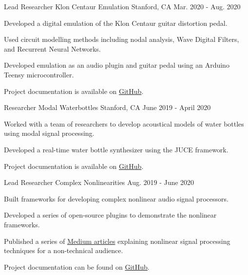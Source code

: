 \begin{cventries}
  \cventry
    {Lead Researcher} %
    {Klon Centaur Emulation} %
    {Stanford, CA} %
    {Mar. 2020 - Aug. 2020} %
    {
      \begin{cvitems} %
        \item {Developed a digital emulation of the Klon Centaur guitar distortion pedal.}
        \item {Used circuit modelling methods including nodal analysis, Wave Digital Filters, and Recurrent Neural Networks.}
        \item {Developed emulation as an audio plugin and guitar pedal using an Arduino Teensy microcontroller.}
        \item {Project documentation is available on \href{https://github.com/jatinchowdhury18/KlonCentaur}{GitHub}.}
      \end{cvitems}
    }

  \cventry
    {Researcher} %
    {Modal Waterbottles} %
    {Stanford, CA} %
    {June 2019 - April 2020} %
    {
      \begin{cvitems} %
        \item {Worked with a team of researchers to develop acoustical
               models of water bottles using modal signal processing.}
        \item {Developed a real-time water bottle synthesizer using the JUCE framework.}
        \item {Project documentation is available on \href{https://github.com/jatinchowdhury18/modal-waterbottles}{GitHub}.}
      \end{cvitems}
    }

  \cventry
    {Lead Researcher} %
    {Complex Nonlinearities} %
    {} %
    {Aug. 2019 - June 2020} %
    {
      \begin{cvitems} %
        \item {Built frameworks for developing complex nonlinear audio signal processors.}
        \item {Developed a series of open-source plugins to demonstrate the nonlinear frameworks.}
        \item {Published a series of \href{https://medium.com/@jatinchowdhury18/complex-nonlinearities-episode-0-why-4ad9b3eed60f}{Medium articles}
               explaining nonlinear signal processing techniques for a non-technical audience.}
        \item {Project documentation can be found on \href{https://github.com/jatinchowdhury18/ComplexNonlinearities}{GitHub}.}
      \end{cvitems}
    }


\end{cventries}
